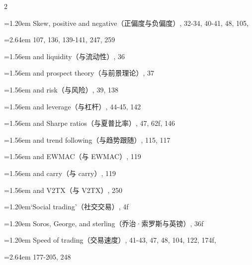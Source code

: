 {\begin{multicols}{2}
\par \noindent\hangindent=1.20em\hspace*{0.00em} Skew, positive and negative（正偏度与负偏度）, 32-34, 40-41, 48, 105,
\par \noindent\hangindent=2.64em\hspace*{1.44em} 107, 136, 139-141, 247, 259
\par \noindent\hangindent=1.56em\hspace*{0.36em} and liquidity（与流动性）, 36
\par \noindent\hangindent=1.56em\hspace*{0.36em} and prospect theory（与前景理论）, 37
\par \noindent\hangindent=1.56em\hspace*{0.36em} and risk（与风险）, 39, 138
\par \noindent\hangindent=1.56em\hspace*{0.36em} and leverage（与杠杆）, 44-45, 142
\par \noindent\hangindent=1.56em\hspace*{0.36em} and Sharpe ratios（与夏普比率）, 47, 62f, 146
\par \noindent\hangindent=1.56em\hspace*{0.36em} and trend following（与趋势跟随）, 115, 117
\par \noindent\hangindent=1.56em\hspace*{0.36em} and EWMAC（与 EWMAC）, 119
\par \noindent\hangindent=1.56em\hspace*{0.36em} and carry（与 carry）, 119
\par \noindent\hangindent=1.56em\hspace*{0.36em} and V2TX（与 V2TX）, 250
\par \noindent\hangindent=1.20em\hspace*{0.00em}‘Social trading’（社交交易）, 4f
\par \noindent\hangindent=1.20em\hspace*{0.00em} Soros, George, and sterling（乔治·索罗斯与英镑）, 36f
\par \noindent\hangindent=1.20em\hspace*{0.00em} Speed of trading（交易速度）, 41-43, 47, 48, 104, 122, 174f,
\par \noindent\hangindent=2.64em\hspace*{1.44em} 177-205, 248

\end{multicols}}

